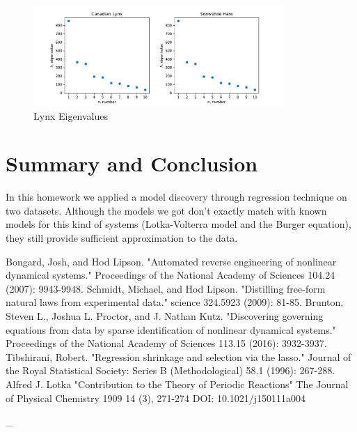 \documentclass{article}
\begin{document}
\begin{figure}[h!]
    \centering
    \includegraphics[width=0.85\textwidth]{images/lynx_eigenvalues.pdf}
    \caption{\label{fig:lynx_eigen} Lynx Eigenvalues}    
\end{figure}


\section{Summary and Conclusion}

In this homework we applied a model discovery through regression technique on two datasets. Although the models we got don't exactly match with known models for this kind of systems (Lotka-Volterra model and the Burger equation), they still provide sufficient approximation to the data. 

\begin{thebibliography}{99}

 Bongard, Josh, and Hod Lipson. "Automated reverse engineering of nonlinear dynamical systems." Proceedings of the National Academy of Sciences 104.24 (2007): 9943-9948.
 Schmidt, Michael, and Hod Lipson. "Distilling free-form natural laws from experimental data." science 324.5923 (2009): 81-85.
Brunton, Steven L., Joshua L. Proctor, and J. Nathan Kutz. "Discovering governing equations from data by sparse identification of nonlinear dynamical systems." Proceedings of the National Academy of Sciences 113.15 (2016): 3932-3937.
Tibshirani, Robert. "Regression shrinkage and selection via the lasso." Journal of the Royal Statistical Society: Series B (Methodological) 58.1 (1996): 267-288.
Alfred J. Lotka "Contribution to the Theory of Periodic Reactions"
The Journal of Physical Chemistry 1909 14 (3), 271-274 DOI: 10.1021/j150111a004
\end{thebibliography}
{\_ }
\newpage
\end{document}
